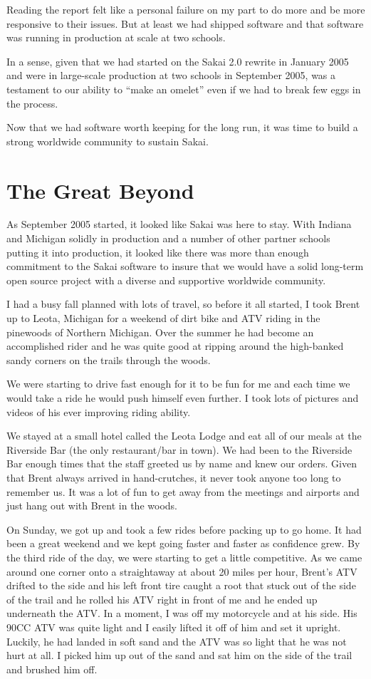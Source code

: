 \documentclass[12pt]{book}
\begin{document}
Reading the report felt like a personal failure on my part
to do more and be more responsive to their issues.  But
at least we had shipped software and that software was
running in production at scale at two schools.

In a sense, given that we had started on the Sakai
2.0 rewrite in January 2005 and were in large-scale
production at two schools in September 2005, was a
testament to our ability to ``make an omelet'' even
if we had to break few eggs in the process.

Now that we had software worth keeping for the long run,
it was time to build a strong worldwide community to sustain
Sakai.

\chapter{The Great Beyond}

As September 2005 started, it looked like Sakai
was here to stay.   With Indiana and Michigan
solidly in production and a number of other
partner schools putting it into production, it looked like
there was more than enough commitment to the
Sakai software to insure that we would have a solid
long-term open source project with a diverse and
supportive worldwide community.

I had a busy fall planned with lots of travel, so before
it all started, I took Brent up to Leota, Michigan
for a weekend of dirt bike and ATV riding in the
pinewoods of Northern Michigan.  Over the
summer he had become an accomplished rider and he
was quite good at ripping around the high-banked
sandy corners on the trails through the woods.

We were starting to drive fast enough for it to
be fun for me and each time we would take a ride
he would push himself even further.  I took lots
of pictures and videos of his ever improving
riding ability.

We stayed at a small hotel called the Leota
Lodge and eat all of our meals at the Riverside
Bar (the only restaurant\slash bar in town).  We had been
to the Riverside Bar enough times that the staff
greeted us by name and knew our orders.  Given that
Brent always arrived in hand-crutches, it never
took anyone too long to remember us.  It was a lot
of fun to get away from the meetings and airports
and just hang out with Brent in the woods.

On Sunday, we got up and took a few rides before
packing up to go home.  It had been a great weekend
and we kept going faster and faster as confidence
grew.  By the third ride of the day, we were
starting to get a little competitive.  As we came
around one corner onto a straightaway at about 20
miles per hour, Brent's ATV drifted to the side
and his left front tire caught a root that stuck
out of the side of the trail and he rolled his ATV
right in front of me and he ended up underneath
the ATV.
In a moment, I was off my motorcycle and at his
side.  His 90CC ATV was quite light and I easily
lifted it off of him and set it upright.  Luckily,
he had landed in soft sand and the ATV was so
light that he was not hurt at all.
I picked him up out of the sand and sat him
on the side of the trail and brushed him off.
\end{document}
